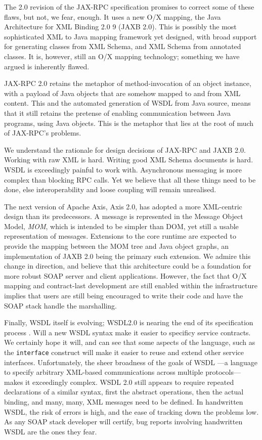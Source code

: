 The 2.0 revision of the JAX-RPC specification promises to correct some of these
flaws, but not, we fear, enough. It uses a new O/X mapping, the Java
Architecture for XML Binding 2.0 9 (JAXB 2.0)\cite{spec:JAX-B-20}. This is possibly the most
sophisticated XML to Java mapping framework yet designed, with broad support
for generating classes from XML Schema, and XML Schema from annotated classes.
It is, however, still an O/X mapping technology; something we have argued is
inherently flawed.  
 
JAX-RPC 2.0 retains the metaphor of method-invocation of an object instance, with
a payload of Java objects that are somehow mapped to and from XML content. This
and the automated generation of WSDL from Java source, means that it still
retains the pretense of enabling communication between Java programs, using Java
objects. This is the metaphor that lies at the root of much of JAX-RPC's
problems.

We understand the rationale for design decisions of JAX-RPC and JAXB 2.0. Working
with raw XML is hard. Writing good XML Schema documents is hard. WSDL is
exceedingly painful to work with. Asynchronous messaging is more complex than
blocking RPC calls. Yet we believe that all these things need to be done, else
interoperability and loose coupling will remain unrealised.

The next version of Apache Axis, Axis 2.0, has adopted a more XML-centric design
than its predecessors. A message is represented in the Message Object Model,
\emph{MOM}, which is intended to be simpler than DOM, yet still a usable
representation of messages. Extensions to the core runtime are expected to
provide the mapping between the MOM tree and Java object graphs, an
implementation of JAXB 2.0 being the primary such extension. We admire this
change in direction, and believe that this architecture could be a foundation
for more robust SOAP server and client applications. However, the fact that O/X
mapping and contract-last development are still enabled within the
infrastructure implies that users are still being encouraged to write their code
and have the SOAP stack handle the marshalling. 

Finally, WSDL itself is evolving; WSDL2.0 is nearing the end of its
specification process \cite{spec:WSDL-20}. Will a new WSDL syntax make it easier
to specificy service contracts. We certainly hope it will, and can see that some
aspects of the language, such as the {\tt interface} construct will make it
easier to reuse and extend other service interfaces. Unfortunately, the sheer
broadness of the goals of WSDL ---a language to specify arbitrary
XML-based communications across multiple protocols--- makes it exceedingly
complex. WSDL 2.0 still appears to require repeated declarations of a similar
syntax, first the abstract operations, then the actual binding, and many, many,
XML messages need to be defined. In handwritten WSDL, the risk of errors is
high, and the ease of tracking down the problems low. As any SOAP stack
developer will certify, bug reports involving handwritten WSDL are the ones they
fear. 

